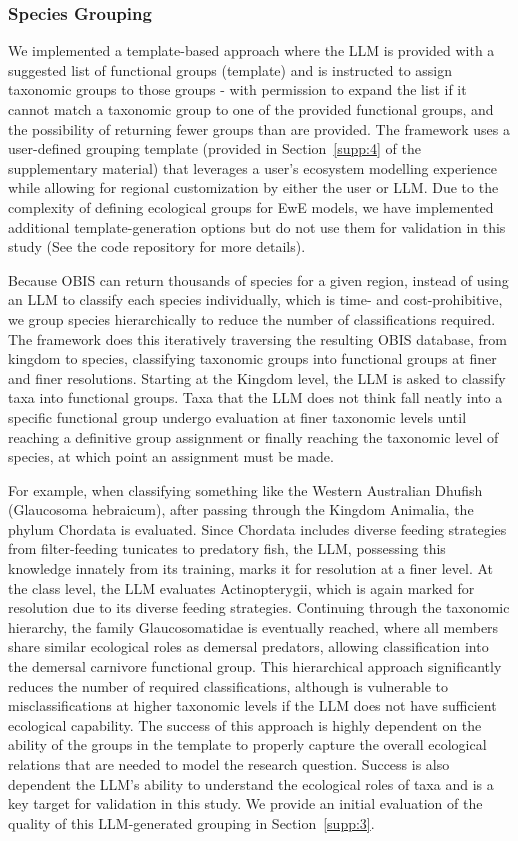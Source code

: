 \subsubsection{Species Grouping}

We implemented a template-based approach where the LLM is provided with a suggested list of functional groups (template) and is instructed to assign taxonomic groups to those groups - with permission to expand the list if it cannot match a taxonomic group to one of the provided functional groups, and the possibility of returning fewer groups than are provided. The framework uses a user-defined grouping template (provided in Section~\ref{supp:4} of the supplementary material) that leverages a user's ecosystem modelling experience while allowing for regional customization by either the user or LLM. Due to the complexity of defining ecological groups for EwE models, we have implemented additional template-generation options but do not use them for validation in this study (See the code repository for more details).

Because OBIS can return thousands of species for a given region, instead of using an LLM to classify each species individually, which is time- and cost-prohibitive, we group species hierarchically to reduce the number of classifications required. The framework does this iteratively traversing the resulting OBIS database, from kingdom to species, classifying taxonomic groups into functional groups at finer and finer resolutions. Starting at the Kingdom level, the LLM is asked to classify taxa into functional groups. Taxa that the LLM does not think fall neatly into a specific functional group undergo evaluation at finer taxonomic levels until reaching a definitive group assignment or finally reaching the taxonomic level of species, at which point an assignment must be made. 

For example, when classifying something like the Western Australian Dhufish (Glaucosoma hebraicum), after passing through the Kingdom Animalia, the phylum Chordata is evaluated. Since Chordata includes diverse feeding strategies from filter-feeding tunicates to predatory fish, the LLM, possessing this knowledge innately from its training, marks it for resolution at a finer level. At the class level, the LLM evaluates Actinopterygii, which is again marked for resolution due to its diverse feeding strategies. Continuing through the taxonomic hierarchy, the family Glaucosomatidae is eventually reached, where all members share similar ecological roles as demersal predators, allowing classification into the demersal carnivore functional group. This hierarchical approach significantly reduces the number of required classifications, although is vulnerable to misclassifications at higher taxonomic levels if the LLM does not have sufficient ecological capability. The success of this approach is highly dependent on the ability of the groups in the template to properly capture the overall ecological relations that are needed to model the research question. Success is also dependent the LLM's ability to understand the ecological roles of taxa and is a key target for validation in this study. We provide an initial evaluation of the quality of this LLM-generated grouping in Section~\ref{supp:3}.


